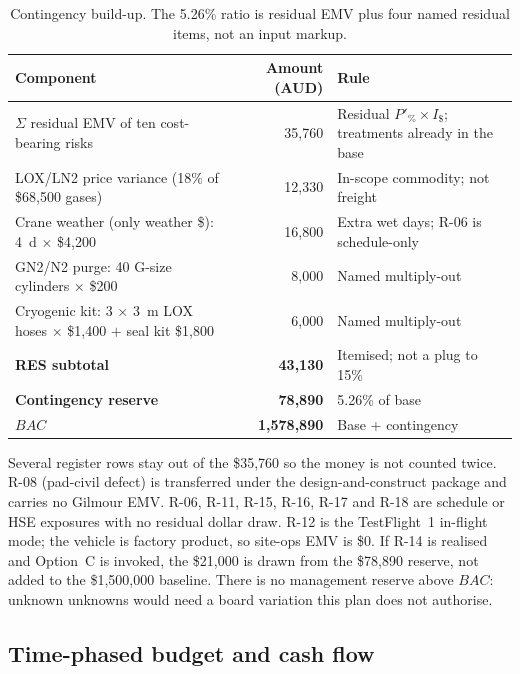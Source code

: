 \begin{table}[H]
\centering
\small
\caption[Contingency build-up]{Contingency build-up. The 5.26\% ratio is residual EMV plus four named residual items, not an input markup.}
\label{tab:contingency}
\begin{tabular}{@{}p{8.4cm} r p{4.1cm}@{}}
\toprule
Component & Amount (AUD) & Rule \\
\midrule
$\Sigma$ residual EMV of ten cost-bearing risks & 35{,}760 & Residual $P'_{\%}\times I_{\$}$; treatments already in the base \\
LOX/LN2 price variance (18\% of \$68{,}500 gases) & 12{,}330 & In-scope commodity; not freight \\
Crane weather (only weather \$): 4~d $\times$ \$4{,}200 & 16{,}800 & Extra wet days; R-06 is schedule-only \\
GN2/N2 purge: 40 G-size cylinders $\times$ \$200 & 8{,}000 & Named multiply-out \\
Cryogenic kit: 3 $\times$ 3~m LOX hoses $\times$ \$1{,}400 $+$ seal kit \$1{,}800 & 6{,}000 & Named multiply-out \\
\midrule
\textbf{RES subtotal} & \textbf{43{,}130} & Itemised; not a plug to 15\% \\
\textbf{Contingency reserve} & \textbf{78{,}890} & 5.26\% of base \\
\textbf{$BAC$} & \textbf{1{,}578{,}890} & Base + contingency \\
\bottomrule
\end{tabular}
\end{table}

Several register rows stay out of the \$35{,}760 so the money is not counted twice. R-08 (pad-civil defect) is transferred under the design-and-construct package and carries no Gilmour EMV. R-06, R-11, R-15, R-16, R-17 and R-18 are schedule or HSE exposures with no residual dollar draw. R-12 is the TestFlight~1 in-flight mode; the vehicle is factory product, so site-ops EMV is \$0. If R-14 is realised and Option~C is invoked, the \$21{,}000 is drawn from the \$78{,}890 reserve, not added to the \$1{,}500{,}000 baseline. There is no management reserve above $BAC$: unknown unknowns would need a board variation this plan does not authorise.

\subsection{Time-phased budget and cash flow}
\label{sec:cost-cashflow}

